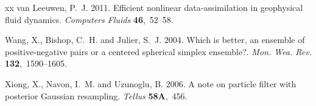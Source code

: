 \documentclass[useAMS,usenatbib]{tellus}
\begin{document}
\begin{thebibliography}{xx}
van Leeuwen, P.~J. 2011. {Efficient nonlinear data-assimilation in geophysical
  fluid dynamics}. {\em Computers Fluids} {\bf 46},~52--58.

Wang, X., Bishop, C.~H. and Julier, S.~J. 2004. {Which is better, an ensemble
  of positive-negative pairs or a centered spherical simplex ensemble?}. {\em
  Mon. Wea. Rev.} {\bf 132},~1590--1605.

Xiong, X., Navon, I.~M. and Uzunoglu, B. 2006. {A note on particle filter with
  posterior Gaussian resampling}. {\em {Tellus}} {\bf 58A},~456.

\end{thebibliography}
\end{document}

